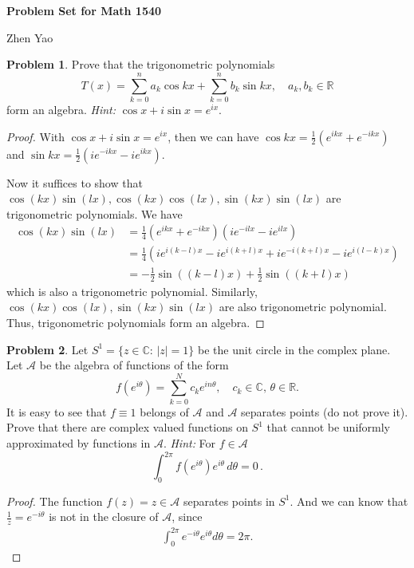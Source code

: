 \documentclass[11pt]{article}
\theoremstyle{definition}
\newtheorem{problem}{Problem}
\theoremstyle{definition}
\begin{document}
\centerline{\bf Problem Set for Math 1540}
\centerline{Zhen Yao}

\bigskip


\begin{problem}
Prove that the trigonometric polynomials
$$
T(x)=\sum_{k=0}^n a_k\cos kx +\sum_{k=0}^n b_k\sin kx,
\quad a_k,b_k\in\mathbb{R}
$$
form an algebra. {\em Hint:} $\cos x+ i\sin x= e^{ix}$.
\end{problem}
\begin{proof}
With $\cos x+ i\sin x= e^{ix}$, then we can have $\cos kx = \frac{1}{2} \left(e^{ikx} + e^{-ikx}\right)$ and $\sin kx = \frac{1}{2} \left(ie^{-ikx} - ie^{ikx}\right)$. 

Now it suffices to show that $\cos(kx)\sin(lx), \cos(kx)\cos(lx), \sin(kx)\sin(lx)$ are trigonometric polynomials. We have
\begin{align*}
    \cos(kx)\sin(lx) & = \frac{1}{4} \left(e^{ikx} + e^{-ikx}\right) \left(ie^{-ilx} - ie^{ilx}\right) \\
    & = \frac{1}{4} \left(ie^{i(k-l)x} - ie^{i(k+l)x} + ie^{-i(k+l)x} - ie^{i(l-k)x} \right) \\
    & = - \frac{1}{2} \sin((k-l)x) + \frac{1}{2} \sin((k+l)x)
\end{align*}
which is also a trigonometric polynomial. Similarly, $\cos(kx)\cos(lx), \sin(kx)\sin(lx)$ are also trigonometric polynomial. Thus, trigonometric polynomials form an algebra.
\end{proof}

\medskip

\begin{problem}\label{problem_2}
Let $S^1=\{ z\in\mathbb{C}:\, |z|=1\}$ be the unit circle in the complex plane.
Let $\mathcal{A}$ be the algebra of functions of the form
$$
f\left(e^{i\theta}\right)=\sum_{k=0}^N c_k e^{in\theta},
\quad
c_k\in\mathbb{C},\, \theta\in\mathbb{R}.
$$
It is easy to see that
$f\equiv 1$ belongs of $\mathcal{A}$ and $\mathcal{A}$ separates points
(do not prove it).
Prove that there are complex valued functions on $S^1$ that cannot be uniformly approximated by functions in $\mathcal{A}$.
{\em Hint:} For $f\in \mathcal{A}$
$$
\int_0^{2\pi} f\left(e^{i\theta}\right)e^{i\theta}\, d\theta =0\, .
$$
\end{problem}
\begin{proof}
The function $f(z) = z\in \mathcal{A}$ separates points in $S^1$. And we can know that $\frac{1}{z} = e^{-i\theta}$ is not in the closure of $\mathcal{A}$, since
\begin{align*}
    \int^{2\pi}_0 e^{-i\theta} e^{i\theta} d\theta = 2\pi.
\end{align*}
\end{proof}
\end{document}
